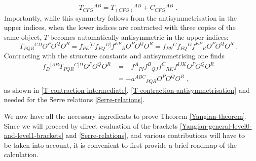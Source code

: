 \documentclass[12pt]{article}
\numberwithin{equation}{section}
\begin{document}
\begin{enumerate}
\begin{equation}
T_{CFG}{}^{AB}=T_{(CFG)}{}^{AB} + C_{CFG}{}^{AB} \,\, .
\end{equation}
Importantly, while this symmetry follows from the antisymmetrisation in the upper indices, when the lower indices are contracted with three copies of the same object, $T$ becomes automatically antisymmetric in the upper indices:
\begin{equation}\label{T-tensor-contraction}
\!T_{PQR}{}^{CD}O^{P}O^{Q}O^{R}\!=\!f_{PE}{}^{[C}f_{FQ}{}^{D]}f^{EF}{}_{R}O^{P}O^{Q}O^{R}\!=\!f_{PE}{}^{C}f_{FQ}{}^{D}f^{EF}{}_{R}O^{P}O^{Q}O^{R} \, .
\end{equation}
Contracting with the structure constants and antisymmetrising one finds
\begin{equation}\label{Serre-structure-T-tensor-contraction}
\begin{aligned}
f_{D}{}^{[AB}T_{PQR}{}^{C]D}O^{P}O^{Q}O^{R}&=-f^{A}{}_{PI}f^{B}{}_{QJ}f^{C}{}_{RK}f^{IJK}O^{P}O^{Q}O^{R}
\\
&=-a^{ABC}{}_{PQR}O^{P}O^{Q}O^{R}
\,\, ,
\end{aligned}
\end{equation}
as shown in \eqref{T-contraction-intermediate}, \eqref{T-contraction-antisymmetrisation} and needed for the Serre relations \eqref{Serre-relations}.
\end{enumerate}
We now have all the necessary ingredients to prove Theorem \ref{Yangian-theorem}. Since we will proceed by direct evaluation of the brackets \eqref{Yangian-general-level0-and-level1-brackets} and \eqref{Serre-relations}, and various contributions will have to be taken into account, it is convenient to first provide a brief roadmap of the calculation.
\end{document}
